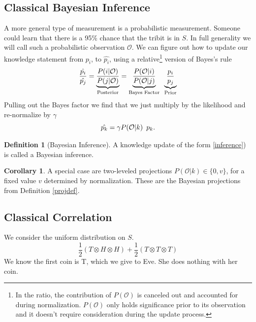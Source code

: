 \documentclass[12pt,a4paper]{article}
\theoremstyle{myrule}
\theoremstyle{postulate}
\theoremstyle{definition}
\newtheorem{definition}{Definition}[section]
\newtheorem{corollary}{Corollary}[theorem]
\begin{document}
\subsection{Classical Bayesian Inference}
A more general type of measurement is a probabilistic measurement.  Someone could learn that there is a 95\% chance that the tribit is in $S$.  In full generality we will call such a probabilistic observation $\mathcal{O}$.  We can figure out how to update our knowledge statement from $p_i$, to $\hat{p_i}$, using a relative\footnote{In the ratio, the contribution of $P(\mathcal{O})$ is canceled out and accounted for during normalization.  $P(\mathcal{O})$ only holds significance prior to its observation and it doesn't require consideration during the update process.} version of Bayes's rule
\[
  \frac{\hat{p_i}}{\hat{p_j}} = \underbrace{\frac{P(i | \mathcal{O})}{P(j | \mathcal{O})}}_\text{Posterior}
                              = \underbrace{\frac{P(\mathcal{O} | i)}{P(\mathcal{O}|j)}}_\text{Bayes Factor}  \hspace{0.07 in}  \underbrace{\frac{p_i}{p_j}}_\text{Prior}
\]
Pulling out the Bayes factor we find that we just multiply by the likelihood and re-normalize by $\gamma$
\begin{equation}
\label{inference}
  \hat{p_k} =  \gamma P(\mathcal{O} | k) \hspace{0.07 in} p_k.
\end{equation}
\begin{definition}[Bayesian Inference]
\label{infdef}
  A knowledge update of the form \ref{inference}) is called a Bayesian inference.
\end{definition}
\begin{corollary}
A special case are two-leveled projections $P(\mathcal{O} | k) \in \{0,v\}$, for a fixed value $v$ determined by normalization.  These are the Bayesian projections from Definition \ref{projdef}.
\end{corollary}

\subsection{Classical Correlation}
We consider the uniform distribution on $S$.
\begin{equation}
\label{uniform_S}
\frac{1}{2}(T \otimes H \otimes H) + \frac{1}{2}(T \otimes T \otimes T)
\end{equation}
We know the first coin is T, which we give to Eve.  She does nothing with her coin.
\end{document}
